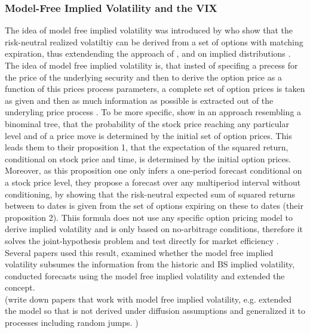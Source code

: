 \subsubsection{Model-Free Implied Volatility and the VIX}\label{sec:223VIX}
The idea of model free implied volatility was introduced by \textcite{britten2000} who show that the risk-neutral realized volatiltiy can be derived from a set of options with matching expiration, thus extendending the approach of \textcite{derman1994} \textcite{dupire1994}, \textcite{dupire1997} and \textcite{rubinstein1994} on implied distributions \parencite{jiang2003}. The idea of model free implied volatility is, that insted of specifing a precess for the price of the underlying security and then to derive the option price as a function of this prices process parameters,  a complete set of option prices is taken as given and then as much information as possible is extracted out of the underyling price process \parencite{britten2000}. To be more specific, \textcite{britten2000} show in an approach resembling a binominal tree, that the probability of the stock price reaching any particular level and of a price move is determined by the initial set of option prices. This leads them to their proposition 1, that the expectation of the squared return, conditional on stock price and time, is determined by the initial option prices. Moreover, as this proposition one only infers a one-period forecast conditional on a stock price level, they propose a forecast over any multiperiod interval without conditioning, by showing that the risk-neutral expected sum of squared returns between to dates is given from the set of options expiring on these to dates (their proposition 2). Thiis formula does not use any specific option pricing model to derive implied volatility and is only based on no-arbitrage conditions, therefore it solves the joint-hypothesis problem and test directly for market efficiency \parencite{jiang2003}.  \\
Several papers used this result, examined whether the model free implied volatility subsumes the information from the historic and \gls{BS} implied volatility, conducted forecasts using the model free implied volatility and extended the concept.\\
(write down papers that work with model free implied volatility, e.g. \citeauthor{jiang2003} extended the model so that is not derived under diffusion assumptions and generalized it to processes including random jumps. )\\
